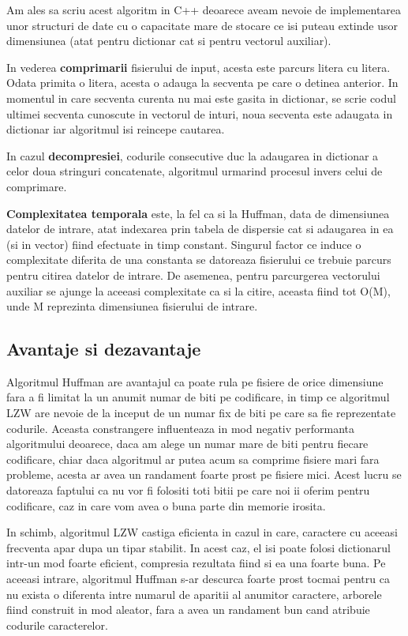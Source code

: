 \documentclass[runningheads]{llncs}
\begin{document}
Am ales sa scriu acest algoritm in C++ deoarece aveam nevoie de implementarea unor structuri de date cu o capacitate
mare de stocare ce isi puteau extinde usor dimensiunea (atat pentru dictionar cat si pentru vectorul auxiliar).

In vederea \textbf{comprimarii} fisierului de input, acesta este parcurs litera cu litera. Odata primita o litera, acesta o adauga la secventa pe care o detinea anterior.
In momentul in care secventa curenta nu mai este gasita in dictionar, se scrie codul ultimei secventa cunoscute in vectorul de inturi,
noua secventa este adaugata in dictionar iar algoritmul isi reincepe cautarea.

In cazul \textbf{decompresiei}, codurile consecutive duc la adaugarea in dictionar a celor doua stringuri concatenate, algoritmul urmarind procesul invers celui de comprimare.

\textbf{Complexitatea temporala} este, la fel ca si la Huffman, data de dimensiunea datelor de intrare, atat indexarea prin tabela de dispersie cat si adaugarea in ea (si in vector)
fiind efectuate in timp constant. Singurul factor ce induce o complexitate diferita de una constanta se datoreaza fisierului
ce trebuie parcurs pentru citirea datelor de intrare. De asemenea, pentru parcurgerea vectorului auxiliar se ajunge la aceeasi complexitate ca si la citire, aceasta fiind tot
O(M), unde M reprezinta dimensiunea fisierului de intrare.


\subsection*{Avantaje si dezavantaje}
Algoritmul Huffman are avantajul ca poate rula pe fisiere de orice dimensiune fara a fi limitat la un anumit numar de biti pe codificare, in timp ce
algoritmul LZW are nevoie de la inceput de un numar fix de biti pe care sa fie reprezentate codurile.
Aceasta constrangere influenteaza in mod negativ performanta  algoritmului deoarece, daca am alege un numar mare de biti pentru fiecare codificare, chiar daca algoritmul ar putea acum
sa comprime fisiere mari fara probleme, acesta ar avea un randament foarte prost pe fisiere mici. Acest lucru se datoreaza faptului ca nu vor fi folositi toti bitii pe care noi ii oferim
pentru codificare, caz in care vom avea o buna parte din memorie irosita.

In schimb, algoritmul LZW castiga eficienta in cazul in care, caractere cu aceeasi frecventa apar dupa un tipar stabilit. In acest caz, el isi poate folosi dictionarul intr-un mod foarte eficient,
compresia rezultata fiind si ea una foarte buna. Pe aceeasi intrare, algoritmul Huffman s-ar descurca foarte prost tocmai pentru ca nu exista o diferenta intre numarul de aparitii al anumitor
caractere, arborele fiind construit in mod aleator, fara a avea un randament bun cand atribuie codurile caracterelor.
\end{document}
